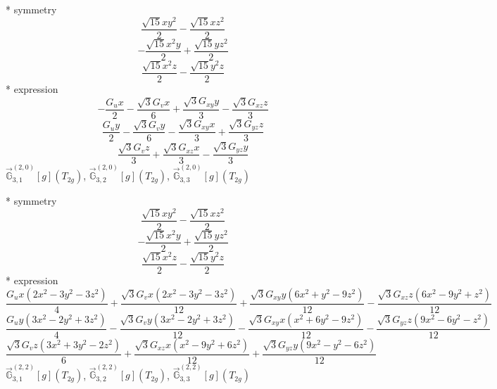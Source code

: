 \documentclass[fleqn,8pt]{jsarticle}
\begin{document}
\noindent\quad ** symmetry
\begin{dmath*}
\frac{\sqrt{15} x y^{2}}{2} - \frac{\sqrt{15} x z^{2}}{2}
\end{dmath*}
\begin{dmath*}
- \frac{\sqrt{15} x^{2} y}{2} + \frac{\sqrt{15} y z^{2}}{2}
\end{dmath*}
\begin{dmath*}
\frac{\sqrt{15} x^{2} z}{2} - \frac{\sqrt{15} y^{2} z}{2}
\end{dmath*}
\noindent\quad ** expression
\begin{dmath*}
- \frac{G_{u} x}{2} - \frac{\sqrt{3} G_{v} x}{6} + \frac{\sqrt{3} G_{xy} y}{3} - \frac{\sqrt{3} G_{xz} z}{3}
\end{dmath*}
\begin{dmath*}
\frac{G_{u} y}{2} - \frac{\sqrt{3} G_{v} y}{6} - \frac{\sqrt{3} G_{xy} x}{3} + \frac{\sqrt{3} G_{yz} z}{3}
\end{dmath*}
\begin{dmath*}
\frac{\sqrt{3} G_{v} z}{3} + \frac{\sqrt{3} G_{xz} x}{3} - \frac{\sqrt{3} G_{yz} y}{3}
\end{dmath*}
\noindent\quad $\vec{\mathbb{G}}_{3,1}^{(2,0)}[g](T_{2g})$, $\vec{\mathbb{G}}_{3,2}^{(2,0)}[g](T_{2g})$, $\vec{\mathbb{G}}_{3,3}^{(2,0)}[g](T_{2g})$

\noindent\quad ** symmetry
\begin{dmath*}
\frac{\sqrt{15} x y^{2}}{2} - \frac{\sqrt{15} x z^{2}}{2}
\end{dmath*}
\begin{dmath*}
- \frac{\sqrt{15} x^{2} y}{2} + \frac{\sqrt{15} y z^{2}}{2}
\end{dmath*}
\begin{dmath*}
\frac{\sqrt{15} x^{2} z}{2} - \frac{\sqrt{15} y^{2} z}{2}
\end{dmath*}
\noindent\quad ** expression
\begin{dmath*}
\frac{G_{u} x \left(2 x^{2} - 3 y^{2} - 3 z^{2}\right)}{4} + \frac{\sqrt{3} G_{v} x \left(2 x^{2} - 3 y^{2} - 3 z^{2}\right)}{12} + \frac{\sqrt{3} G_{xy} y \left(6 x^{2} + y^{2} - 9 z^{2}\right)}{12} - \frac{\sqrt{3} G_{xz} z \left(6 x^{2} - 9 y^{2} + z^{2}\right)}{12}
\end{dmath*}
\begin{dmath*}
\frac{G_{u} y \left(3 x^{2} - 2 y^{2} + 3 z^{2}\right)}{4} - \frac{\sqrt{3} G_{v} y \left(3 x^{2} - 2 y^{2} + 3 z^{2}\right)}{12} - \frac{\sqrt{3} G_{xy} x \left(x^{2} + 6 y^{2} - 9 z^{2}\right)}{12} - \frac{\sqrt{3} G_{yz} z \left(9 x^{2} - 6 y^{2} - z^{2}\right)}{12}
\end{dmath*}
\begin{dmath*}
\frac{\sqrt{3} G_{v} z \left(3 x^{2} + 3 y^{2} - 2 z^{2}\right)}{6} + \frac{\sqrt{3} G_{xz} x \left(x^{2} - 9 y^{2} + 6 z^{2}\right)}{12} + \frac{\sqrt{3} G_{yz} y \left(9 x^{2} - y^{2} - 6 z^{2}\right)}{12}
\end{dmath*}
\noindent\quad $\vec{\mathbb{G}}_{3,1}^{(2,2)}[g](T_{2g})$, $\vec{\mathbb{G}}_{3,2}^{(2,2)}[g](T_{2g})$, $\vec{\mathbb{G}}_{3,3}^{(2,2)}[g](T_{2g})$
\end{document}
